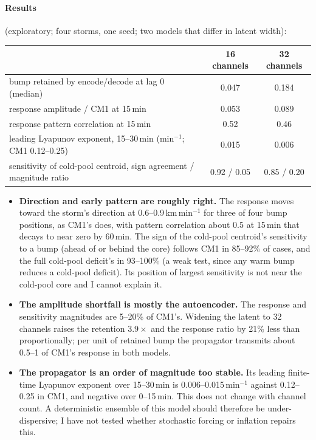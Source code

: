 \documentclass[11pt]{article}
\begin{document}
\paragraph{Results} (exploratory; four storms, one seed; two models that differ in latent width):
\begin{center}\small
\begin{tabular}{lcc}\toprule
 & 16 channels & 32 channels\\\midrule
bump retained by encode/decode at lag 0 (median) & 0.047 & 0.184\\
response amplitude / CM1 at 15\,min & 0.053 & 0.089\\
response pattern correlation at 15\,min & 0.52 & 0.46\\
leading Lyapunov exponent, 15--30\,min (min$^{-1}$; CM1 0.12--0.25) & 0.015 & 0.006\\
sensitivity of cold-pool centroid, sign agreement / magnitude ratio & 0.92 / 0.05 & 0.85 / 0.20\\\bottomrule
\end{tabular}\end{center}
\begin{itemize}
\item \textbf{Direction and early pattern are roughly right.} The response moves toward the storm's direction at 0.6--0.9\,km\,min$^{-1}$ for three of four bump positions, as CM1's does, with pattern correlation about 0.5 at 15\,min that decays to near zero by 60\,min. The sign of the cold-pool centroid's sensitivity to a bump (ahead of or behind the core) follows CM1 in 85--92\% of cases, and the full cold-pool deficit's in 93--100\% (a weak test, since any warm bump reduces a cold-pool deficit). Its position of largest sensitivity is not near the cold-pool core and I cannot explain it.
\item \textbf{The amplitude shortfall is mostly the autoencoder.} The response and sensitivity magnitudes are 5--20\% of CM1's. Widening the latent to 32 channels raises the retention $3.9\times$ and the response ratio by 21\% less than proportionally; per unit of retained bump the propagator transmits about 0.5--1 of CM1's response in both models.
\item \textbf{The propagator is an order of magnitude too stable.} Its leading finite-time Lyapunov exponent over 15--30\,min is 0.006--0.015\,min$^{-1}$ against 0.12--0.25 in CM1, and negative over 0--15\,min. This does not change with channel count. A deterministic ensemble of this model should therefore be under-dispersive; I have not tested whether stochastic forcing or inflation repairs this.
\end{itemize}
\end{document}
